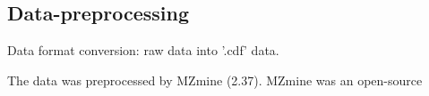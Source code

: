 \subsection{Data-preprocessing}
Data format conversion: 
raw data into '.cdf' data.

The data was preprocessed by MZmine (2.37). MZmine was an open-source 
